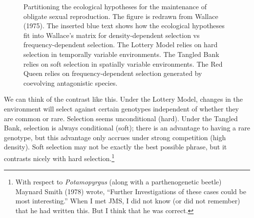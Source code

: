 \documentclass[
  letterpaper,
]{book}
\begin{document}
\begin{figure}


\caption[Partitioning the ecological hypotheses for the maintenance of
obligate sexual reproduction]{\label{fig-2-2}Partitioning the ecological
hypotheses for the maintenance of obligate sexual reproduction. The
figure is redrawn from Wallace (1975). The inserted blue text shows how
the ecological hypotheses fit into Wallace's matrix for
density-dependent selection vs frequency-dependent selection. The
Lottery Model relies on hard selection in temporally variable
environments. The Tangled Bank relies on soft selection in spatially
variable environments. The Red Queen relies on frequency-dependent
selection generated by coevolving antagonistic species.}

\end{figure}%

We can think of the contrast like this. Under the Lottery Model, changes
in the environment will select against certain genotypes independent of
whether they are common or rare. Selection seems unconditional (hard).
Under the Tangled Bank, selection is always conditional (soft); there is
an advantage to having a rare genotype, but this advantage only accrues
under strong competition (high density). Soft selection may not be
exactly the best possible phrase, but it contrasts nicely with hard
selection.\footnote{With respect to \emph{Potamopyrgus} (along with a
  parthenogenetic beetle) Maynard Smith (1978) wrote, ``Further
  Investigations of these cases could be most interesting.'' When I met
  JMS, I did not know (or did not remember) that he had written this.
  But I think that he was correct.}
\end{document}

